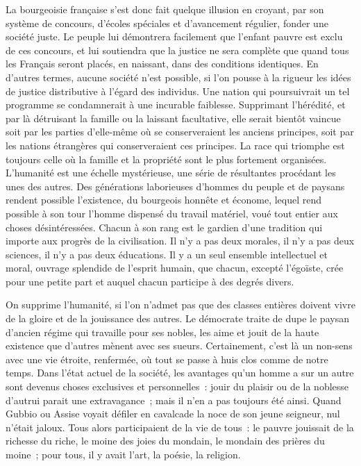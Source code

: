 \documentclass[french,twoside]{book} %
\begin{document}
La bourgeoisie française s’est donc fait quelque illusion en croyant, par son système de concours, d’écoles spéciales et d’avancement régulier, fonder une société juste. Le peuple lui démontrera facilement que l’enfant pauvre est exclu de ces concours, et lui soutiendra que la justice ne sera complète que quand tous les Français seront placés, en naissant, dans des conditions identiques. En d’autres termes, aucune société n’est possible, si l’on pousse à la rigueur les idées de justice distributive à l’égard des individus. Une nation qui poursuivrait un tel programme se condamnerait à une incurable faiblesse. Supprimant l’hérédité, et par là détruisant la famille ou la laissant facultative, elle serait bientôt vaincue soit par les parties d’elle-même où se conserveraient les anciens principes, soit par les nations étrangères qui conserveraient ces principes. La race qui triomphe est toujours celle où la famille et la propriété sont le plus fortement organisées. L’humanité est une échelle mystérieuse, une série de résultantes procédant les unes des autres. Des générations laborieuses d’hommes du peuple et de paysans rendent possible l’existence, du bourgeois honnête et économe, lequel rend possible à son tour l’homme dispensé du travail matériel, voué tout entier aux choses désintéressées. Chacun à son rang est le gardien d’une tradition qui importe aux progrès de la civilisation. Il n’y a pas deux morales, il n’y a pas deux sciences, il n’y a pas deux éducations. Il y a un seul ensemble intellectuel et moral, ouvrage splendide de l’esprit humain, que chacun, excepté l’égoïste, crée pour une petite part et auquel chacun participe à des degrés divers.\par
On supprime l’humanité, si l’on n’admet pas que des classes entières doivent vivre de la gloire et de la jouissance des autres. Le démocrate traite de dupe le paysan d’ancien régime qui travaille pour ses nobles, les aime et jouit de la haute existence que d’autres mènent avec ses sueurs. Certainement, c’est là un non-sens avec une vie étroite, renfermée, où tout se passe à huis clos comme de notre temps. Dans l’état actuel de la société, les avantages qu’un homme a sur un autre sont devenus choses exclusives et personnelles : jouir du plaisir ou de la noblesse d’autrui parait une extravagance ; mais il n’en a pas toujours été ainsi. Quand Gubbio ou Assise voyait défiler en cavalcade la noce de son jeune seigneur, nul n’était jaloux. Tous alors participaient de la vie de tous : le pauvre jouissait de la richesse du riche, le moine des joies du mondain, le mondain des prières du moine ; pour tous, il y avait l’art, la poésie, la religion.\par
\end{document}
